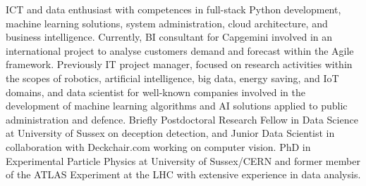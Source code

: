 
ICT and data enthusiast with competences in full-stack Python development, machine learning solutions, system administration, cloud architecture, and business intelligence. Currently, BI consultant for Capgemini involved in an international project to analyse customers demand and forecast within the Agile framework. Previously IT project manager, focused on research activities within the scopes of robotics, artificial intelligence, big data, energy saving, and IoT domains, and data scientist for well-known companies involved in the development of machine learning algorithms and AI solutions applied to public administration and defence. Briefly Postdoctoral Research Fellow in Data Science at University of Sussex on deception detection, and Junior Data Scientist in collaboration with Deckchair.com working on computer vision. PhD in Experimental Particle Physics at University of Sussex/CERN and former member of the ATLAS Experiment at the LHC with extensive experience in data analysis. 
